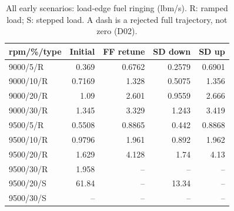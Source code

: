 \begin{table}[htbp]\centering\small\setlength{\tabcolsep}{4pt}\begin{tabular}{@{}lrrrr@{}}\toprule
rpm/\%/type & Initial & FF retune & SD down & SD up\\\midrule
9000/5/R & 0.369 & 0.6762 & 0.2579 & 0.6901\\
9000/10/R & 0.7169 & 1.328 & 0.5075 & 1.356\\
9000/20/R & 1.09 & 2.601 & 0.9559 & 2.666\\
9000/30/R & 1.345 & 3.329 & 1.243 & 3.419\\
9500/5/R & 0.5508 & 0.8865 & 0.442 & 0.8868\\
9500/10/R & 0.9796 & 1.961 & 0.892 & 1.962\\
9500/20/R & 1.629 & 4.128 & 1.74 & 4.13\\
9500/30/R & 1.958 & -- & -- & --\\
9500/20/S & 61.84 & -- & 13.34 & --\\
9500/30/S & -- & -- & -- & --\\
\bottomrule\end{tabular}\caption{All early scenarios: load-edge fuel ringing (lbm/s). R: ramped load; S: stepped load. A dash is a rejected full trajectory, not zero (D02).}\label{tab:early_ring}\end{table}